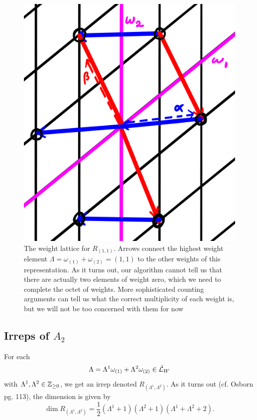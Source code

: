 \begin{figure}
    \centering
    \includegraphics{2018/11/20181122_s1-1.png}
    \caption{The weight lattice for $R_{(1,1)}$. Arrows connect the highest weight element $\Lambda=\omega_{(1)}+\omega_{(2)}=(1,1)$ to the other weights of this representation. As it turns out, our algorithm cannot tell us that there are actually two elements of weight zero, which we need to complete the octet of weights. More sophisticated counting arguments can tell us what the correct multiplicity of each weight is, but we will not be too concerned with them for now}
    \label{fig:s1-1}
\end{figure}

\subsection*{Irreps of $A_2$} For each 
$$\Lambda=\Lambda^1 \omega_{(1)}+\Lambda^2 \omega_{(2)} \in \bar {\mathcal L}_W$$
with $\Lambda^1,\Lambda^2 \in \mathbb{Z}_{\geq 0}$, we get an irrep denoted $R_{(\Lambda^1,\Lambda^2)}$. As it turns out (cf. Osborn pg. 113), the dimension is given by
$$\dim R_{(\Lambda^1,\Lambda^2)}=\frac{1}{2}(\Lambda^1+1)(\Lambda^2+1)(\Lambda^1+\Lambda^2+2).$$

